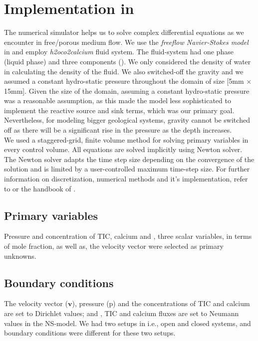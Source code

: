 \section{Implementation in \DuMuX}\label{ssec:impdum}
The numerical simulator \DuMuX helps us to solve complex differential equations as we encounter in free/porous medium flow. 
We use the \textit{freeflow Navier-Stokes model} in \DuMuX and employ \textit{h2oco2calcium} fluid system. 
The fluid-system had one phase (liquid phase) and three components (). We only considered the density 
of water in calculating the density of the fluid. We also switched-off the gravity and we assumed a constant hydro-static pressure 
throughout the domain of size [5mm $\times$ 15mm]. Given the size of the domain, assuming a constant hydro-static pressure was 
a reasonable assumption, as this made the model less sophisticated to implement the reactive source and sink terms, which was our 
primary goal. Nevertheless, for modeling bigger geological systems, gravity cannot be switched off as there 
will be a significant rise in the pressure as the depth increases.\\
We used a staggered-grid, finite volume method for solving primary variables in every control volume. 
All equations are solved implicitly using Newton solver. The Newton solver adapts 
the time step size depending on the convergence of the solution and is limited by a user-controlled maximum time-step size. 
For further information on discretization, numerical methods and it's implementation, refer to \cite{Koch2020} or the handbook 
of \DuMuX \cite{Kochetal2020Dumux}.

\subsection*{Primary variables} Pressure and concentration  of TIC, calcium and , three scalar variables, in 
terms of mole fraction, as well as, the velocity vector were selected as primary unknowns. 

\subsection*{Boundary conditions} 
The velocity vector ($\mathbf{v}$), pressure (p) and the concentrations of TIC and calcium are set to Dirichlet values; 
and , TIC and calcium fluxes are set to Neumann values in the NS-model. We had two setups in \DuMuX i.e., open 
and closed systems, and boundary conditions were different for these two setups.

